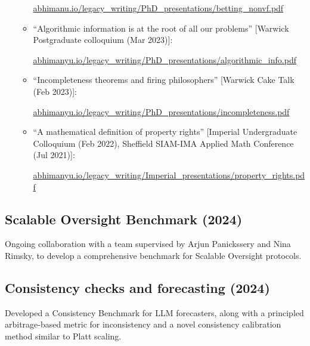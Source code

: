 \documentclass{article}
\newenvironment{relatedwork}
   {
     \begin{mdframed}[
       leftmargin=1cm,
       rightmargin=0cm,
       innerleftmargin=10pt,
       innerrightmargin=0pt,
       innertopmargin=0.5em,
       innerbottommargin=0.5em,
       linewidth=1pt,
       linecolor=gray,
       topline=false,
       bottomline=false,
       rightline=false
     ]
     \footnotesize
   }
   {
     \end{mdframed}
   }
\begin{document}
\begin{relatedwork}
\begin{itemize}[label=—]
\begin{itemize}
                        \href{https://abhimanyu.io/legacy_writing/PhD_presentations/betting_nonvf.pdf}{abhimanu.io/legacy\_writing/PhD\_presentations/betting\_nonvf.pdf}

                  \item ``Algorithmic information is at the root of all our problems'' [Warwick Postgraduate colloquium (Mar 2023)]:

                        \href{https://abhimanyu.io/legacy_writing/PhD_presentations/algorithmic_info.pdf}{abhimanyu.io/legacy\_writing/PhD\_presentations/algorithmic\_info.pdf}

                  \item ``Incompleteness theorems and firing philosophers'' [Warwick Cake Talk (Feb 2023)]:

                        \href{https://abhimanyu.io/legacy_writing/PhD_presentations/incompleteness.pdf}{abhimanyu.io/legacy\_writing/PhD\_presentations/incompleteness.pdf}

                  \item ``A mathematical definition of property rights'' [Imperial Undergraduate Colloquium (Feb 2022), Sheffield SIAM-IMA Applied Math Conference (Jul 2021)]:

                        \href{https://abhimanyu.io/legacy_writing/Imperial_presentations/property_rights.pdf}{abhimanyu.io/legacy\_writing/Imperial\_presentations/property\_rights.pdf}
              \end{itemize}
    \end{itemize}
\end{relatedwork}

\subsection*{Scalable Oversight Benchmark (2024)}

Ongoing collaboration with a team supervised by Arjun Panickssery and Nina Rimsky, to develop a comprehensive benchmark for Scalable Oversight protocols.

\subsection*{Consistency checks and forecasting (2024)}

Developed a Consistency Benchmark for LLM forecasters, along with a principled arbitrage-based metric for inconsistency and a novel consistency calibration method similar to Platt scaling.
\end{document}
